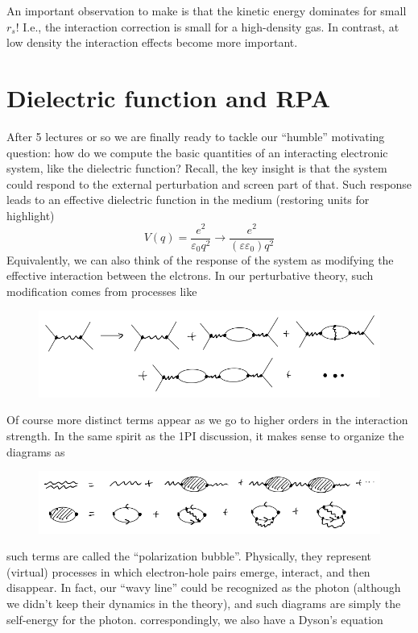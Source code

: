 An important observation to make is that the kinetic energy dominates for small $r_s$! I.e., the interaction correction is small for a high-density gas. In contrast, at low density the interaction effects become more important.

\section{Dielectric function and RPA}

After 5 lectures or so we are finally ready to tackle our ``humble'' motivating question: how do we compute the basic quantities of an interacting electronic system, like the dielectric function? Recall, the key insight is that the system could respond to the external perturbation and screen part of that. Such response leads to an effective dielectric function in the medium (restoring units for highlight)
\[ V\left( q \right) =\frac{e^2}{\varepsilon _0q^2}\rightarrow \frac{e^2}{\left( \varepsilon \varepsilon _0 \right) q^2}\]
Equivalently, we can also think of the response of the system as modifying the effective interaction between the elctrons. In our perturbative theory, such modification comes from processes like
\begin{figure}[H]
    \centering
    \includegraphics[width=\textwidth]{jupyterbook/data/fig/lec19-fig04.png}
\end{figure}
Of course more distinct terms appear as we go to higher orders in the interaction strength. In the same spirit as the 1PI discussion, it makes sense to organize the diagrams as
\begin{figure}[H]
    \centering
    \includegraphics[width=\textwidth]{jupyterbook/data/fig/lec19-fig05.png}
\end{figure}
such terms are called the ``polarization bubble''. Physically, they represent (virtual) processes in which electron-hole pairs emerge, interact, and then disappear. In fact, our ``wavy line'' could be recognized as the photon (although we didn't keep their dynamics in the theory), and such diagrams are simply the self-energy for the photon. correspondingly, we also have a Dyson's equation
